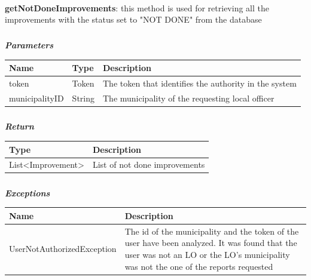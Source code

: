 					\paragraph{}
							\textbf{getNotDoneImprovements}: this method is used for retrieving all the improvements with the status set to "NOT DONE" from the database
							\subparagraph{}
							\vspace{-3mm}
							\textit{\textbf{Parameters}}
							\vspace{-2mm}
								\begin{table}[!h]
									\begin{tabular}{L{0.2\textwidth}L{0.15\textwidth}L{0.45\textwidth}}
										\toprule
										\textbf{Name} & \textbf{Type} & \textbf{Description} \\
										\midrule
								  		token & Token & The token that identifies the authority in the system \\
municipalityID & String & The municipality of the requesting local officer \\
								 		\bottomrule
									\end{tabular}
								\end{table}
							\subparagraph{}
							\vspace{-6mm}
								\textit{\textbf{Return}}
								\vspace{-2mm}
									\begin{table}[!h]
									\begin{tabular}{L{0.3\textwidth}L{0.5\textwidth}}
										\toprule
										\textbf{Type} & \textbf{Description} \\
										\midrule
								  		List<Improvement> & List of not done improvements \\
								 		\bottomrule
									\end{tabular}
								\end{table}
							\subparagraph{}
							\vspace{-6mm}
								\textit{\textbf{Exceptions}}
								\vspace{-2mm}
									\begin{table}[!h]
									\begin{tabular}{L{0.4\textwidth}L{0.4\textwidth}}
										\toprule
										\textbf{Name} & \textbf{Description} \\
										\midrule
								  		UserNotAuthorizedException & The id of the municipality and the token of the user have been analyzed. It was found that the user was not an LO or the LO's  municipality was not the one of the reports requested  \\
								 		\bottomrule
									\end{tabular}
								\end{table}
					
